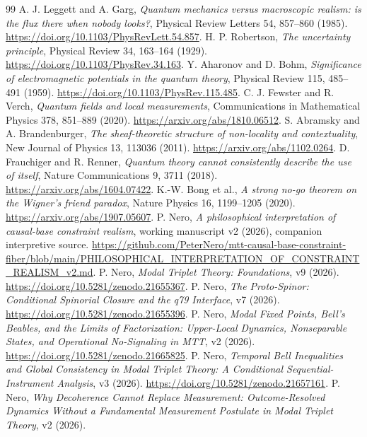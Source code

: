 \documentclass[11pt,a4paper]{article}
\begin{document}
\begin{thebibliography}{99}
A. J. Leggett and A. Garg, \emph{Quantum mechanics versus macroscopic
realism: is the flux there when nobody looks?},
Physical Review Letters 54, 857--860 (1985).
\url{https://doi.org/10.1103/PhysRevLett.54.857}.
H. P. Robertson, \emph{The uncertainty principle},
Physical Review 34, 163--164 (1929).
\url{https://doi.org/10.1103/PhysRev.34.163}.
Y. Aharonov and D. Bohm, \emph{Significance of electromagnetic potentials
in the quantum theory}, Physical Review 115, 485--491 (1959).
\url{https://doi.org/10.1103/PhysRev.115.485}.
C. J. Fewster and R. Verch, \emph{Quantum fields and local measurements},
Communications in Mathematical Physics 378, 851--889 (2020).
\url{https://arxiv.org/abs/1810.06512}.
S. Abramsky and A. Brandenburger,
\emph{The sheaf-theoretic structure of non-locality and contextuality},
New Journal of Physics 13, 113036 (2011).
\url{https://arxiv.org/abs/1102.0264}.
D. Frauchiger and R. Renner, \emph{Quantum theory cannot consistently
describe the use of itself}, Nature Communications 9, 3711 (2018).
\url{https://arxiv.org/abs/1604.07422}.
K.-W. Bong et al., \emph{A strong no-go theorem on the Wigner's friend
paradox}, Nature Physics 16, 1199--1205 (2020).
\url{https://arxiv.org/abs/1907.05607}.
P. Nero, \emph{A philosophical interpretation of causal-base constraint
realism}, working manuscript v2 (2026), companion interpretive source.
\url{https://github.com/PeterNero/mtt-causal-base-constraint-fiber/blob/main/PHILOSOPHICAL_INTERPRETATION_OF_CONSTRAINT_REALISM_v2.md}.
P. Nero, \emph{Modal Triplet Theory: Foundations}, v9 (2026).
\url{https://doi.org/10.5281/zenodo.21655367}.
P. Nero, \emph{The Proto-Spinor: Conditional Spinorial Closure and the
q79 Interface}, v7 (2026).
\url{https://doi.org/10.5281/zenodo.21655396}.
P. Nero, \emph{Modal Fixed Points, Bell's Beables, and the Limits of
Factorization: Upper-Local Dynamics, Nonseparable States, and Operational
No-Signaling in MTT}, v2 (2026).
\url{https://doi.org/10.5281/zenodo.21665825}.
P. Nero, \emph{Temporal Bell Inequalities and Global Consistency in Modal
Triplet Theory: A Conditional Sequential-Instrument Analysis}, v3 (2026).
\url{https://doi.org/10.5281/zenodo.21657161}.
P. Nero, \emph{Why Decoherence Cannot Replace Measurement:
Outcome-Resolved Dynamics Without a Fundamental Measurement Postulate
in Modal Triplet Theory}, v2 (2026).

\end{thebibliography}
\end{document}
